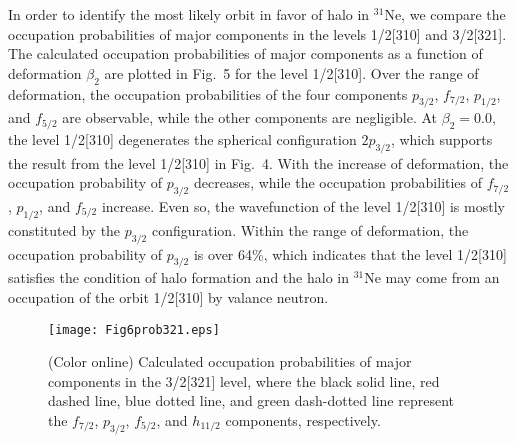 \documentclass[twocolumn,prc,showpacs,preprintnumbers,superscriptaddress,floatfix]{revtex4}
\begin{document}
In order to identify the most likely orbit in favor of halo in $^{31}$Ne, we
compare the occupation probabilities of major components in the levels
1/2[310] and 3/2[321]. The calculated occupation probabilities of major
components as a function of deformation $\beta _{2}$ are plotted in Fig.~5
for the level 1/2[310]. Over the range of deformation, the occupation
probabilities of the four components $p_{3/2}$, $f_{7/2}$, $p_{1/2}$, and $%
f_{5/2}$ are observable, while the other components are negligible. At $%
\beta _{2}=0.0$, the level 1/2[310] degenerates the spherical configuration $%
2p_{3/2}$, which supports the result from the level 1/2[310] in Fig.~4. With
the increase of deformation, the occupation probability of $p_{3/2}$
decreases, while the occupation probabilities of $f_{7/2}$, $p_{1/2}$, and $%
f_{5/2}$ increase. Even so, the wavefunction of the level 1/2[310] is mostly
constituted by the $p_{3/2}$ configuration. Within the range of deformation,
the occupation probability of $p_{3/2}$ is over 64\%, which indicates that
the level 1/2[310] satisfies the condition of halo formation and the halo in
$^{31}$Ne may come from an occupation of the orbit 1/2[310] by valance
neutron.
\begin{figure}[tph]
\centering%
\texttt{[image: Fig6prob321.eps]}\centering
\caption{(Color online) Calculated occupation probabilities of major
components in the 3/2[321] level, where the black solid line, red dashed
line, blue dotted line, and green dash-dotted line represent the $f_{7/2}$, $%
p_{3/2}$, $f_{5/2}$, and $h_{11/2}$ components, respectively.}
\end{figure}
\end{document}

